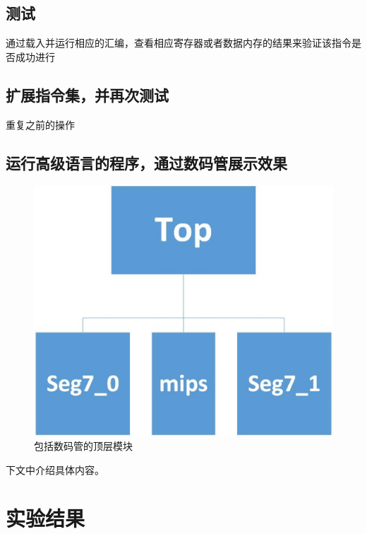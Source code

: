 \documentclass[UTF8]{article}
\begin{document}
\subsection{测试}
通过载入并运行相应的汇编，查看相应寄存器或者数据内存的结果来验证该指令是否成功进行

\subsection{扩展指令集，并再次测试}
重复之前的操作

\subsection{运行高级语言的程序，通过数码管展示效果}

\begin{figure}[H]
    \centering
    \includegraphics[width=\linewidth]{9.jpg}
    \caption{包括数码管的顶层模块}
    \label{FIG8}
\end{figure}

下文中介绍具体内容。

\section{实验结果}
\end{document}
